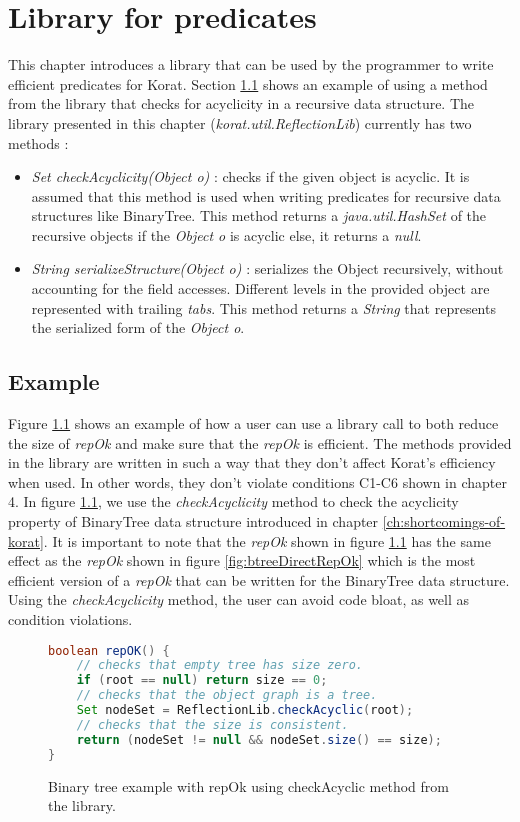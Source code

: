 \chapter{Library for predicates}
\label{ch:library-for-predicates}
This chapter introduces a library that can be used by the programmer to write efficient predicates for Korat. Section \ref{sec:library-for-predicates-example} shows an example of using a method from the library that checks for acyclicity in a recursive data structure. The library presented in this chapter (\emph{korat.util.ReflectionLib}) currently has two methods :
\begin{itemize}
\item \emph{Set checkAcyclicity(Object o)} : checks if the given object is acyclic. It is assumed that this method is used when writing predicates for recursive data structures like BinaryTree. This method returns a \emph{java.util.HashSet} of the recursive objects if the \emph{Object o} is acyclic else, it returns a \emph{null}.
\item \emph{String serializeStructure(Object o)} : serializes the Object recursively, without accounting for the field accesses. Different levels in the provided object are represented with trailing \emph{tabs}. This method returns a \emph{String} that represents the serialized form of the \emph{Object o}.
\end{itemize}

\section{Example}
\label{sec:library-for-predicates-example}
Figure \ref{fig:btreeLibraryRepOk} shows an example of how a user can use a library call to both reduce the size of \emph{repOk} and make sure that the \emph{repOk} is efficient. The methods provided in the library are written in such a way that they don't affect Korat's efficiency when used. In other words, they don't violate conditions C1-C6 shown in chapter 4. In figure \ref{fig:btreeLibraryRepOk}, we use the \emph{checkAcyclicity} method to check the acyclicity property of BinaryTree data structure introduced in chapter \ref{ch:shortcomings-of-korat}. It is important to note that the \emph{repOk} shown in figure \ref{fig:btreeLibraryRepOk} has the same effect as the \emph{repOk} shown in figure \ref{fig:btreeDirectRepOk} which is the most efficient version of a \emph{repOk} that can be written for the BinaryTree data structure. Using the \emph{checkAcyclicity} method, the user can avoid code bloat, as well as condition violations.

\begin{figure}
\centering
\begin{lstlisting}[language=Java]
boolean repOK() {
    // checks that empty tree has size zero.
    if (root == null) return size == 0;
    // checks that the object graph is a tree.
    Set nodeSet = ReflectionLib.checkAcyclic(root);
    // checks that the size is consistent.
    return (nodeSet != null && nodeSet.size() == size);
}
\end{lstlisting}
\caption{Binary tree example with repOk using checkAcyclic method from the library.}
\label{fig:btreeLibraryRepOk}
\end{figure}
